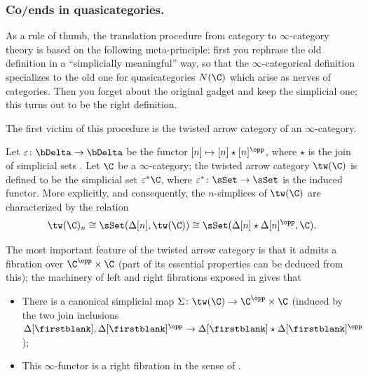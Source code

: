 
\subsubsection{\bf Co/ends in quasicategories.}
\begin{remark}
As a rule of thumb, the translation procedure from category to $\infty$-category theory is based on the following meta-principle: first you rephrase the old definition in a ``simplicially meaningful'' way, so that the $\infty$-categorical definition specializes to the old one for quasicategories $N(\C)$ which arise as nerves of categories. Then you forget about the original gadget and keep the simplicial one; this turns out to be the right definition. 

The first victim of this procedure is the twisted arrow category  of an $\infty$-category.
\end{remark}
\begin{definition}
Let $\varepsilon\colon \bDelta\to \bDelta$ be the functor $[n]\mapsto [n]\star [n]^\opp$, where $\star$ is the join of simplicial sets \cite{Joy,ehlers2008ordinal}. Let $\C$ be a $\infty$-category; the twisted arrow category $\tw(\C)$ is defined to be the simplicial set $\varepsilon^*\C$, where $\varepsilon^*\colon \sSet \to \sSet$ is the induced functor. More explicitly, and consequently, the $n$-simplices of $\tw(\C)$ are characterized by the relation
\[
\tw(\C)_n \cong \sSet(\Delta[n], \tw(\C))\cong \sSet(\Delta[n]\star \Delta[n]^\opp, \C).
\]
\end{definition}
The most important feature of the twisted arrow category is that it admits a fibration over $\C^\opp\times\C$ (part of its essential properties can be deduced from this); the machinery of left and right fibrations exposed in \cite[\adef\textbf{2.0.0.3}]{HTT} gives that 
\begin{itemize}
\item There is a canonical simplicial map $\Sigma\colon \tw(\C) \to \C^\opp\times\C$ (induced by the two join inclusions $\Delta[\firstblank], \Delta[\firstblank]^\opp \to \Delta[\firstblank]\star \Delta[\firstblank]^\opp$);
\item This $\infty$-functor is a right fibration in the sense of \cite[\adef\textbf{2.0.0.3}]{HTT}.
\end{itemize}
